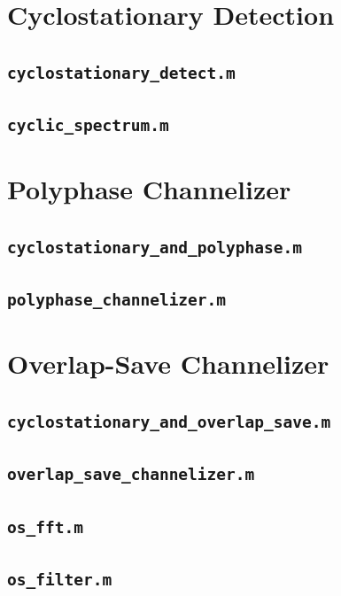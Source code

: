 \documentclass[12pt]{report}
\begin{document}
\section{Cyclostationary Detection}
\subsection{\texttt{cyclostationary\_detect.m}}

\subsection{\texttt{cyclic\_spectrum.m}}


\section{Polyphase Channelizer}
\subsection{\texttt{cyclostationary\_and\_polyphase.m}}

\subsection{\texttt{polyphase\_channelizer.m}}


\section{Overlap-Save Channelizer}
\subsection{\texttt{cyclostationary\_and\_overlap\_save.m}}

\subsection{\texttt{overlap\_save\_channelizer.m}}

\subsection{\texttt{os\_fft.m}}

\subsection{\texttt{os\_filter.m}}

\end{document}
